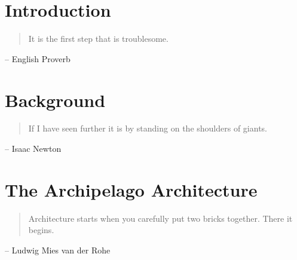 \documentclass[12pt, final]{ucthesis}
\begin{document}
\begin{dissertationText}


\chapter{Introduction												%
    \label{chap:introduction}}              
				\begin{quote}
        It is the first step that is troublesome.
        \end{quote}
            \begin{flushright}
             -- English Proverb
            \end{flushright}
    

\chapter{Background													%
    \label{chap:background}}                
				\begin{quote}
        If I have seen further it is by standing on the shoulders of giants.
        \end{quote}
            \begin{flushright}
             -- Isaac Newton
            \end{flushright}
    

\chapter{The Archipelago Architecture				%
    \label{chap:arch}}                
				\begin{quote}
        Architecture starts when you carefully put two bricks together. There it begins.
        \end{quote}
            \begin{flushright}
             -- Ludwig Mies van der Rohe
            \end{flushright}
    


\end{dissertationText}
\end{document}
